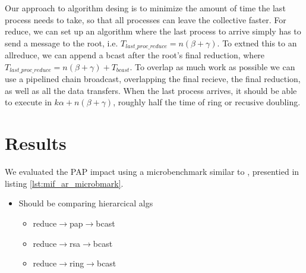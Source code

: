\lstset{label = lst:ucx_sync_bmark}
\lstset{caption = Benchmark to evaluate the overhead of UCX for one-sided operations}




Our approach to algorithm desing is to minimize the amount of time the last process needs to take, so that all processes can leave the collective faster.
For reduce, we can set up an algorithm where the last process to arrive simply has to send a message to the root, i.e. $T_{last\_proc\_reduce}=n(\beta+\gamma)$.
To extned this to an allreduce, we can append a bcast after the root's final reduction, where $T_{last\_proc\_reduce}=n(\beta+\gamma) + T_{bcast}$.
To overlap as much work as possible we can use a pipelined chain broadcast, overlapping the final recieve, the final reduction, as well as all the data transfers.
When the last process arrives, it should be able to execute in $k\alpha+n(\beta+\gamma)$, roughly half the time of ring or recusive doubling.

\section{Results}

We evaluated the PAP impact using a microbenchmark similar to \cite{Faraj2008StudyProcArrivalMPIColl}, presentied in listing \ref{lst:mif_ar_microbmark}.


\begin{itemize}
    \item Should be comparing hierarcical algs
    \begin{itemize}
        \item reduce$\rightarrow$pap$\rightarrow$bcast
        \item reduce$\rightarrow$rsa$\rightarrow$bcast
        \item reduce$\rightarrow$ring$\rightarrow$bcast
    \end{itemize}
\end{itemize}

\lstset{label = lst:mif_ar_microbmark}
\lstset{caption = MIF microbenchmark}
